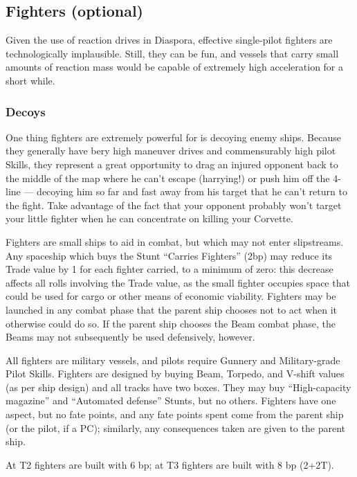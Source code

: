 \subsection{Fighters (optional)}\label{sec:spacecraft-fighters} %

Given the use of reaction drives in Diaspora, effective single-pilot
fighters are technologically implausible. Still, they can be fun, and
vessels that carry small amounts of reaction mass would be capable of
extremely high acceleration for a short while.

\subsubsection{Decoys}

One thing fighters are extremely powerful for is decoying enemy ships. Because
they generally have bery high maneuver drives and commensurably high pilot
Skills, they represent a great opportunity to drag an injured opponent back to
the middle of the map where he can't escape (harrying!) or push him off the
4-line --- decoying him so far and fast away from his target that he can't return
to the fight. Take advantage of the fact that your opponent probably won't
target your little fighter when he can concentrate on killing your Corvette.

Fighters are small ships to aid in combat, but which may not enter
slipstreams. Any spaceship which buys the Stunt ``Carries Fighters''
(2bp) may reduce its Trade value by 1 for each fighter carried, to a
minimum of zero: this decrease affects all rolls involving the Trade
value, as the small fighter occupies space that could be used for
cargo or other means of economic viability. Fighters may be launched
in any combat phase that the parent ship chooses not to act when it
otherwise could do so. If the parent ship chooses the Beam combat
phase, the Beams may not subsequently be used defensively, however.

All fighters are military vessels, and pilots require Gunnery and
Military-grade Pilot Skills. Fighters are designed by buying Beam,
Torpedo, and V-shift values (as per ship design) and all tracks have
two boxes. They may buy ``High-capacity magazine'' and ``Automated
defense'' Stunts, but no others. Fighters have one aspect, but no fate
points, and any fate points spent come from the parent ship (or the
pilot, if a PC); similarly, any consequences taken are given to the
parent ship.

At T2 fighters are built with 6 bp; at T3 fighters are built with 8 bp (2+2T).

